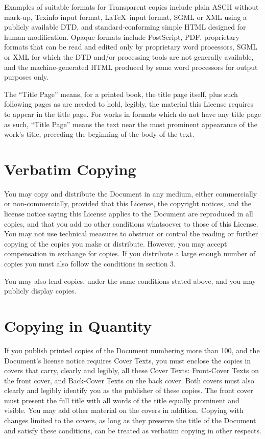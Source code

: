 	Examples of suitable formats for Transparent copies include plain
	ASCII without mark-up, Texinfo input format, \LaTeX~input format, SGML
	or XML using a publicly available DTD, and standard-conforming simple
	HTML designed for human modification.  Opaque formats include
	PostScript, PDF, proprietary formats that can be read and edited only
	by proprietary word processors, SGML or XML for which the DTD and/or
	processing tools are not generally available, and the
	machine-generated HTML produced by some word processors for output
	purposes only.

	The ``Title Page'' means, for a printed book, the title page itself,
	plus such following pages as are needed to hold, legibly, the material
	this License requires to appear in the title page.  For works in
	formats which do not have any title page as such, ``Title Page'' means
	the text near the most prominent appearance of the work's title,
	preceding the beginning of the body of the text.


	\section{Verbatim Copying}

	You may copy and distribute the Document in any medium, either
	commercially or non-commercially, provided that this License, the
	copyright notices, and the license notice saying this License applies
	to the Document are reproduced in all copies, and that you add no other
	conditions whatsoever to those of this License.  You may not use
	technical measures to obstruct or control the reading or further
	copying of the copies you make or distribute.  However, you may accept
	compensation in exchange for copies.  If you distribute a large enough
	number of copies you must also follow the conditions in section 3.

	You may also lend copies, under the same conditions stated above, and
	you may publicly display copies.


	\section{Copying in Quantity}

	If you publish printed copies of the Document numbering more than 100,
	and the Document's license notice requires Cover Texts, you must enclose
	the copies in covers that carry, clearly and legibly, all these Cover
	Texts: Front-Cover Texts on the front cover, and Back-Cover Texts on
	the back cover.  Both covers must also clearly and legibly identify
	you as the publisher of these copies.  The front cover must present
	the full title with all words of the title equally prominent and
	visible.  You may add other material on the covers in addition.
	Copying with changes limited to the covers, as long as they preserve
	the title of the Document and satisfy these conditions, can be treated
	as verbatim copying in other respects.

